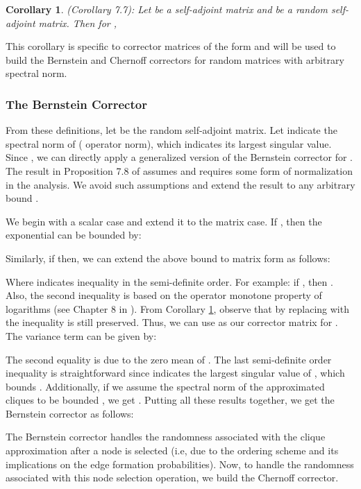 \documentclass{article}
\theoremstyle{plain}
\newtheorem{corollary}[theorem]{Corollary}
\theoremstyle{definition}
\theoremstyle{remark}
\begin{document}
\begin{corollary}
\label{cor:tropp_lieb}
\citep{tropp2019matrix}(Corollary 7.7): Let  be a self-adjoint matrix and  be a random self-adjoint matrix. Then for , 


\end{corollary}

This corollary is specific to corrector matrices of the form  and will be used to build the Bernstein and Chernoff correctors for random matrices with arbitrary spectral norm.

\subsubsection{The Bernstein Corrector}

From these definitions, let  be the random self-adjoint matrix. Let  indicate the spectral norm of  ( operator norm), which indicates its largest singular value. Since , we can directly apply a generalized version of the Bernstein corrector for . The result in Proposition 7.8 of \citet{tropp2019matrix} assumes  and requires some form of normalization in the analysis. We avoid such assumptions and extend the result to any arbitrary bound . 

We begin with a scalar case and extend it to the matrix case. If , then the exponential  can be bounded by:

Similarly, if  then, we can extend the above bound to matrix form as follows:


Where  indicates inequality in the semi-definite order. For example: if , then . Also, the second inequality is based on the operator monotone property of logarithms (see Chapter 8 in \citet{tropp2015introduction}). From Corollary \ref{cor:tropp_lieb}, observe that by replacing  with  the inequality is still preserved. Thus, we can use  as our corrector matrix for . The variance term  can be given by:



The second equality is due to the zero mean of . The last semi-definite order inequality is straightforward since  indicates the largest singular value of , which bounds . Additionally, if we assume the spectral norm of the approximated cliques to be bounded , we get . Putting all these results together, we get the Bernstein corrector as follows:


The Bernstein corrector handles the randomness associated with the clique approximation after a node  is selected (i.e, due to the ordering scheme  and its implications on the edge formation probabilities). Now, to handle the randomness associated with this node selection operation, we build the Chernoff corrector.
\end{document}
